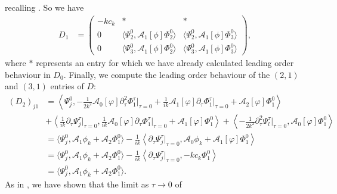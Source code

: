 \documentclass[11pt,leqno]{article}
\numberwithin{equation}{section}
\theoremstyle{definition}
\begin{document}
recalling . So we have
\begin{align*}
	D_{1} &= \begin{pmatrix}
		-kc_{k} & * & *\\
		0 & \langle\Psi_{2}^{0},  \mathcal{A}_{1}[\phi]\Phi_{2}^{0}\rangle & \langle\Psi_{2}^{0},  \mathcal{A}_{1}[\phi]\Phi_{3}^{0}\rangle\\
		0 & \langle\Psi_{3}^{0},  \mathcal{A}_{1}[\phi]\Phi_{2}^{0}\rangle & \langle\Psi_{3}^{0},  \mathcal{A}_{1}[\phi]\Phi_{3}^{0}\rangle
	\end{pmatrix},
\end{align*}
where $ * $ represents an entry for which we have already calculated leading order behaviour in $ D_{0} $. Finally, we compute the leading order behaviour of the $ (2,1) $ and $ (3,1) $ entries of $ D $:
\begin{align*}
	(D_{2})_{j1} &= \left\langle\Psi_{j}^{0},-\frac{1}{2k^{2}}\mathcal{A}_{0}[\varphi]\partial_{\tau}^{2}\Phi_{1}^{\tau}\bigg\lvert_{\tau = 0} + \frac{1}{ik}\mathcal{A}_{1}[\varphi]\partial_{\tau}\Phi_{1}^{\tau}\big\lvert_{\tau = 0} + \mathcal{A}_{2}[\varphi]\Phi_{1}^{0}\right\rangle\\
	&+ \left\langle\frac{1}{ik}\partial_{\tau}\Psi_{j}^{\tau}\bigg|_{\tau = 0},\frac{1}{ik}\mathcal{A}_{0}[\varphi]\partial_{\tau}\Phi_{1}^{\tau}\bigg|_{\tau = 0} + \mathcal{A}_{1}[\varphi]\Phi_{1}^{0}\right\rangle + \left\langle -\frac{1}{2k^{2}}\partial_{\tau}^{2}\Psi_{l}^{\tau}\bigg\lvert_{\tau = 0},\mathcal{A}_{0}[\varphi]\Phi_{1}^{0}\right \rangle\\
	&= \langle \Psi_{j}^{0},\mathcal{A}_{1}\phi_{k} + \mathcal{A}_{2}\Phi_{1}^{0}\rangle - \frac{1}{ik}\left\langle\partial_{\tau}\Psi_{j}^{\tau}\big|_{\tau = 0},\mathcal{A}_{0}\phi_{k} + \mathcal{A}_{1}[\varphi]\Phi_{1}^{0}\right\rangle\\
	&= \langle \Psi_{j}^{0},\mathcal{A}_{1}\phi_{k} + \mathcal{A}_{2}\Phi_{1}^{0}\rangle - \frac{1}{ik}\left\langle\partial_{\tau}\Psi_{j}^{\tau}\big|_{\tau = 0},-kc_{k}\Phi_{1}^{0}\right\rangle\\
	&= \langle \Psi_{j}^{0},\mathcal{A}_{1}\phi_{k} + \mathcal{A}_{2}\Phi_{1}^{0}\rangle.
\end{align*}
As in \cite{BNR14}, we have shown that the limit as $ \tau \rightarrow 0 $ of
\end{document}
